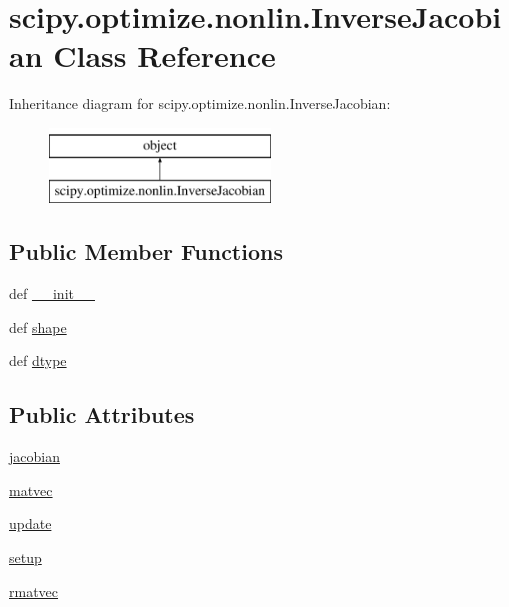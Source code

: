 \hypertarget{classscipy_1_1optimize_1_1nonlin_1_1InverseJacobian}{}\section{scipy.\+optimize.\+nonlin.\+Inverse\+Jacobian Class Reference}
\label{classscipy_1_1optimize_1_1nonlin_1_1InverseJacobian}
Inheritance diagram for scipy.\+optimize.\+nonlin.\+Inverse\+Jacobian\+:\begin{figure}[H]
\begin{center}
\leavevmode
\includegraphics[height=2.000000cm]{classscipy_1_1optimize_1_1nonlin_1_1InverseJacobian}
\end{center}
\end{figure}
\subsection*{Public Member Functions}
\begin{DoxyCompactItemize}
\item 
def \hyperlink{classscipy_1_1optimize_1_1nonlin_1_1InverseJacobian_a01a4391ed081ca0743e685bbdea2c876}{\+\_\+\+\_\+init\+\_\+\+\_\+}
\item 
def \hyperlink{classscipy_1_1optimize_1_1nonlin_1_1InverseJacobian_acec486de8321ba8bfcc9b4347425df88}{shape}
\item 
def \hyperlink{classscipy_1_1optimize_1_1nonlin_1_1InverseJacobian_a6cc914d94bb565052687a74d750f4085}{dtype}
\end{DoxyCompactItemize}
\subsection*{Public Attributes}
\begin{DoxyCompactItemize}
\item 
\hyperlink{classscipy_1_1optimize_1_1nonlin_1_1InverseJacobian_a35a9bcb0822d0628c7f49b1d73431a6d}{jacobian}
\item 
\hyperlink{classscipy_1_1optimize_1_1nonlin_1_1InverseJacobian_a3e100e04033a660f0480b82cb09582cc}{matvec}
\item 
\hyperlink{classscipy_1_1optimize_1_1nonlin_1_1InverseJacobian_a72a07f217180db6b53ef6efd43f3ed87}{update}
\item 
\hyperlink{classscipy_1_1optimize_1_1nonlin_1_1InverseJacobian_a856473a4587975cc1c433297584d9ca1}{setup}
\item 
\hyperlink{classscipy_1_1optimize_1_1nonlin_1_1InverseJacobian_ac077f7e00dc5e263ce5cc33f9ef163ee}{rmatvec}
\end{DoxyCompactItemize}


